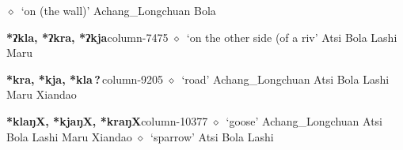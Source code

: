          $\diamond$~`on (the wall)'
         Achang\_Longchuan 
\hspace{1ex}
         Bola 
  \item {\footnotesize \textbf{*ʔkla, *ʔkra, *ʔkja}}{\tiny column-7475}
         $\diamond$~`on the other side (of a riv'
         Atsi 
\hspace{1ex}
         Bola 
\hspace{1ex}
         Lashi 
\hspace{1ex}
         Maru 
  \item {\footnotesize \textbf{*kra, *kja, *kla\,?\,}}{\tiny column-9205}
         $\diamond$~`road'
         Achang\_Longchuan 
\hspace{1ex}
         Atsi 
\hspace{1ex}
         Bola 
\hspace{1ex}
         Lashi 
\hspace{1ex}
         Maru 
\hspace{1ex}
         Xiandao 
  \item {\footnotesize \textbf{*klaŋX, *kjaŋX, *kraŋX}}{\tiny column-10377}
         $\diamond$~`goose'
         Achang\_Longchuan 
\hspace{1ex}
         Atsi 
\hspace{1ex}
         Bola 
\hspace{1ex}
         Lashi 
\hspace{1ex}
         Maru 
\hspace{1ex}
         Xiandao 
\hspace{1ex}
         $\diamond$~`sparrow'
         Atsi 
\hspace{1ex}
         Bola 
\hspace{1ex}
         Lashi 
